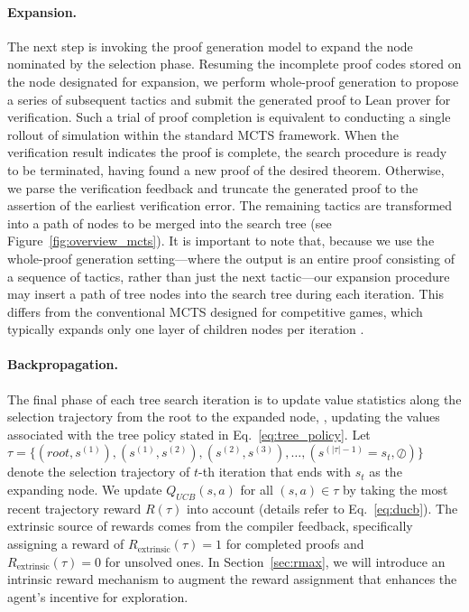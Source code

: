 \paragraph{Expansion.}\label{para:expansion}
The next step is invoking the proof generation model to expand the node nominated by the selection phase.
Resuming the incomplete proof codes stored on the node designated for expansion, we perform whole-proof generation to propose a series of subsequent tactics and submit the generated proof to Lean prover for verification.
Such a trial of proof completion is equivalent to conducting a single rollout of simulation within the standard MCTS framework.
When the verification result indicates the proof is complete, the search procedure is ready to be terminated, having found a new proof of the desired theorem.
Otherwise, we parse the verification feedback and truncate the generated proof to the assertion of the earliest verification error.
The remaining tactics are transformed into a path of nodes to be merged into the search tree (see Figure~\ref{fig:overview_mcts}).
It is important to note that, because we use the whole-proof generation setting—where the output is an entire proof consisting of a sequence of tactics, rather than just the next tactic—our expansion procedure may insert a path of tree nodes into the search tree during each iteration. This differs from the conventional MCTS designed for competitive games, which typically expands only one layer of children nodes per iteration \citep{silver2016mastering, silver2018general, schrittwieser2020mastering}.

\paragraph{Backpropagation.}
The final phase of each tree search iteration is to update value statistics along the selection trajectory from the root to the expanded node, \ie, updating the values associated with the tree policy stated in Eq.~\eqref{eq:tree_policy}.
Let $\tau=\{(root, s^{(1)}), (s^{(1)}, s^{(2)}), (s^{(2)}, s^{(3)}), \dots, (s^{(|\tau|-1)}=s_t, \oslash)\}$ denote the selection trajectory of $t$-th iteration that ends with $s_t$ as the expanding node.
We update $Q_{UCB}(s,a)$ for all $(s,a)\in\tau$ by taking the most recent trajectory reward $R(\tau)$ into account (details refer to Eq.~\eqref{eq:ducb}).
The extrinsic source of rewards comes from the compiler feedback, specifically assigning a reward of $R_{\text{extrinsic}}(\tau)=1$ for completed proofs and $R_{\text{extrinsic}}(\tau)=0$ for unsolved ones.
In Section~\ref{sec:rmax}, we will introduce an intrinsic reward mechanism to augment the reward assignment that enhances the agent's incentive for exploration.

